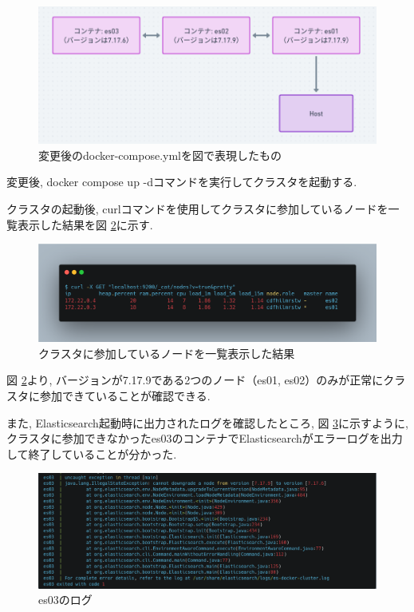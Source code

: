 \begin{figure}[h]
  \begin{center}
    \includegraphics[width=160mm]{sotu/figure/2-7.19.9-and-1-7.17.6.png}
    \caption{変更後のdocker-compose.ymlを図で表現したもの}
    \label{d2}
  \end{center}
\end{figure}

変更後, docker compose up -dコマンドを実行してクラスタを起動する.

クラスタの起動後, curlコマンドを使用してクラスタに参加しているノードを一覧表示した結果を図 \ref{p2}に示す.

\begin{figure}[h]
  \begin{center}
    \includegraphics[width=160mm]{sotu/figure/curl-different.png}
    \caption{クラスタに参加しているノードを一覧表示した結果}
    \label{p2}
  \end{center}
\end{figure}

図 \ref{p2}より, バージョンが7.17.9である2つのノード（es01, es02）のみが正常にクラスタに参加できていることが確認できる.

また, Elasticsearch起動時に出力されたログを確認したところ, 図 \ref{p3}に示すように, クラスタに参加できなかったes03のコンテナでElasticsearchがエラーログを出力して終了していることが分かった.

\begin{figure}[h]
  \begin{center}
    \includegraphics[width=160mm]{sotu/figure/log.png}
    \caption{es03のログ}
    \label{p3}
  \end{center}
\end{figure}

